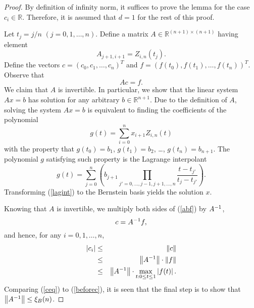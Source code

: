 \documentclass[12pt]{article}
\begin{document}
\begin{proof}
By definition of infinity norm, it suffices to prove the lemma for
the case $c_{i} \in \mathbb{R}$.  Therefore, it is assumed that
$d = 1$ for the rest of this proof.

Let $t_j = j/n$ $(j = 0,1,\ldots,n)$. Define a matrix $A \in \mathbb{R}^{(n+1)
\times (n+1)}$ having element
\[
A_{j+1,i+1}=Z_{i,n}(t_j).
\]
Define the vectors $c = (c_0, c_1, \ldots, c_n)^T$ and
$f = \left( f(t_0), f(t_1), \ldots, f(t_n) \right)^T.$
Observe that
\begin{equation}
\label{abf} Ac = f.
\end{equation}
We claim that $A$ is invertible. In particular, we show that the
linear system $Ax = b$ has solution for any arbitrary $b \in
\mathbb{R}^{n+1}$. Due to the definition of $A$, solving
the system $Ax = b$ is equivalent to finding the coefficients
of the polynomial
\begin{equation}
\label{1dbez} g(t) = \sum_{i=0}^n x_{i+1} Z_{i,n}(t)
\end{equation}
with the property that $g(t_0) = b_1$, $g(t_1) = b_2$,
\ldots, $g(t_n) = b_{n+1}$.  The polynomial $g$ satisfying such
property is the Lagrange interpolant
\begin{equation}
\label{lagint} g(t) = \sum_{j=0}^n \left( b_{j+1} \prod_{j'
= 0,\ldots,j-1,j+1,\ldots,n} \frac{t-t_{j'}}{t_j-t_{j'}}
                          \right).
\end{equation}
Transforming (\ref{lagint}) to the Bernstein basis
yields the solution $x$.

Knowing that $A$ is invertible, we multiply both sides of
(\ref{abf}) by $A^{-1}$,
\begin{equation}
c = A^{-1}f,
\end{equation}
and hence, for any $i = 0, 1, \ldots, n$,
\begin{eqnarray}
|c_{i}| & \leq & \left\|c\right\| \nonumber \\
                       & \leq & \left\|A^{-1}\right\|\cdot\left\|f\right\| \nonumber \\
                       & \leq & \left\|A^{-1}\right\|\cdot\max_{t : 0 \leq t \leq 1} \left|f(t)\right|.
\label{beforec}
\end{eqnarray}
Comparing (\ref{ceq}) to (\ref{beforec}), it is seen that the
final step is to show that $\left\|A^{-1}\right\| \leq \xi_B(n)$.


\end{proof}
\end{document}
